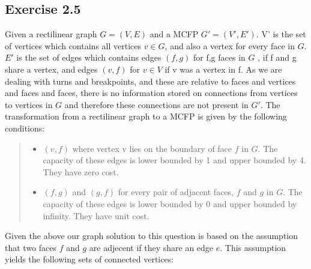 \subsection{Exercise 2.5}
Given a rectilinear graph \(G = (V,E)\) and a MCFP \(G' = (V',E')\). V'  is the set of vertices which contains all vertices \(v \in G\), and also a vertex for every face in \(G\).  \(E'\) is the set of edges which contains edges \((f,g)\) for f,g faces in \(G\) , if f and g share a vertex, and edges \((v,f)\) for \(v \in V\) if v was a vertex in f. As we are dealing with turns and breakpoints, and these are relative to faces and vertices and faces and faces, there is no information stored on connections from vertices to vertices in \(G\) and therefore these connections are not present in \(G'\). 
The transformation from a rectilinear graph to a MCFP is given by the following conditions:
\begin{quote}
  \begin{itemize}
    \item{} \((v,f)\) where vertex v lies on the boundary of face \(f\) in \(G\). The capacity of these
        edges is lower bounded by 1 and upper bounded by 4. They have zero cost.
    \item{} \((f,g)\) and \((g,f)\) for every pair of adjacent faces, \(f\) and \(g\) in \(G\). The capacity of these edges is lower bounded by 0 and upper bounded by infinity. They have unit cost.
  \end{itemize}
\end{quote}

Given the above our graph solution to this question is based on the assumption that two faces \(f\) and \(g\) are adjecent if they share an edge \(e\). This assumption yields the following sets of connected vertices:

